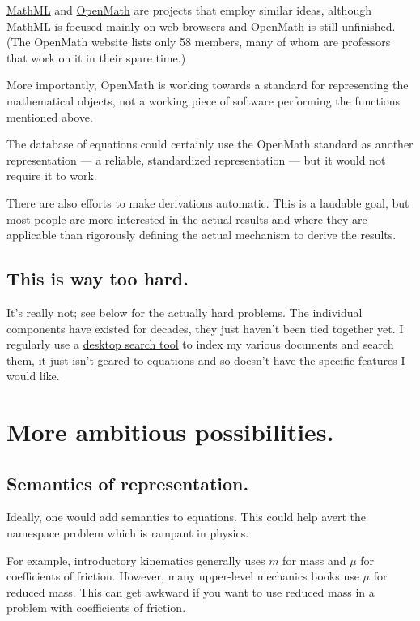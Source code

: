 \documentclass[12pt,letterpaper]{article}
\begin{document}
\href{http://www.w3.org/Math/}{MathML} and \href{http://www.openmath.org/}{OpenMath} are projects that employ similar ideas, although MathML is focused mainly on web browsers and OpenMath is still unfinished. (The OpenMath website lists only 58 members, many of whom are professors that work on it in their spare time.)

More importantly, OpenMath is working towards a standard for representing the mathematical objects, not a working piece of software performing the functions mentioned above.

The database of equations could certainly use the OpenMath standard as another representation --- a reliable, standardized representation --- but it would not require it to work.

There are also efforts to make derivations automatic. This is a laudable goal, but most people are more interested in the actual results and where they are applicable than rigorously defining the actual mechanism to derive the results.

\subsection{This is way too hard.}

It's really not; see below for the actually hard problems. The individual components have existed for decades, they just haven't been tied together yet. I regularly use a \href{https://en.wikipedia.org/wiki/Recoll}{desktop search tool} to index my various documents and search them, it just isn't geared to equations and so doesn't have the specific features I would like.

\section{More ambitious possibilities.}

\subsection{Semantics of representation.}

Ideally, one would add semantics to equations. This could help avert the namespace problem which is rampant in physics.

For example, introductory kinematics generally uses $m$ for mass and $\mu$ for coefficients of friction. However, many upper-level mechanics books use $\mu$ for reduced mass. This can get awkward if you want to use reduced mass in a problem with coefficients of friction.
\end{document}
